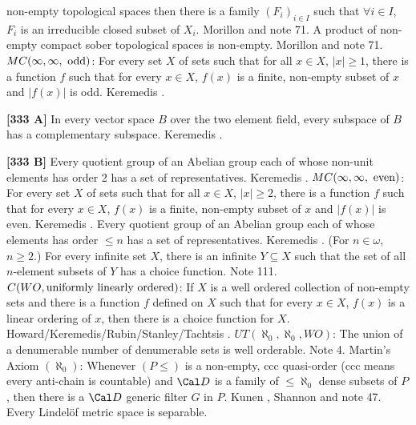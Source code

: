 non-empty topological spaces then there is a family $(F_i)_{i\in I}$
such that $\forall i\in I$, $F_i$ is an irreducible closed subset of
$X_i$.  \ac{Morillon} \cite{1988} and note 71.
\medskip
{}  A product of non-empty compact sober
topological spaces is non-empty.  \ac{Morillon} \cite{1988} and note 71.
\medskip
{} $MC(\infty,\infty,\hbox{ odd})$: For every
set $X$ of  sets such that for all $x\in X$, $|x|\ge 1$, there is a
function $f$ such that  for every $x\in X$, $f(x)$ is a finite, non-empty
subset of $x$ and $|f(x)|$ is odd. \ac{Keremedis} \cite{1996a}.
\smallskip
\item{}{\bf [333 A]} In every vector space $B$ over the two element field,
every subspace of $B$ has a complementary subspace. \ac{Keremedis}
\cite{1996a}.
\smallskip
\item{}{\bf [333 B]} Every quotient group of an Abelian group each of whose
non-unit elements has order 2 has a set of representatives. \ac{Keremedis}
\cite{1996b}.
\medskip
{} $MC(\infty,\infty,\hbox{ even})$: For every
set $X$ of  sets such that for all $x\in X$, $|x|\ge 2$, there is a
function $f$ such that  for every $x\in X$, $f(x)$ is a finite,
non-empty subset of $x$ and $|f(x)|$ is even. \ac{Keremedis}
\cite{1996a}.
\medskip
{} Every quotient group of an Abelian group
each of whose elements has order  $\le n$ has a set of representatives.
\ac{Keremedis} \cite{1996b}.
\medskip
{} (For $n\in\omega$, $n\ge 2$.)  For every
infinite set $X$, there is an infinite $Y \subseteq X$ such that the
set of all $n$-element subsets of $Y$ has a choice function.  Note 111.
\medskip
{} $C(WO,\hbox{uniformly linearly ordered})$:  If
$X$ is a well ordered collection of non-empty sets and there is a function
$f$ defined on $X$ such that for every $x\in X$, $f(x)$ is a linear
ordering of $x$, then there is a choice function for $X$.
\ac{Howard/Keremedis/Rubin/Stanley/Tachtsis} \cite{1999}.
\medskip
{}  $UT(\aleph_0,\aleph_0,WO)$: The union
of a denumerable number of denumerable sets is well orderable.
Note 4.
\medskip
{}  Martin's Axiom $(\aleph_{0})$: Whenever
$(P\le)$ is a non-empty, ccc  quasi-order (ccc means every anti-chain
is countable) and ${\Cal D}$ is a family of $\le\aleph_0$ dense
subsets of $P$, then there is a ${\Cal D}$ generic filter $G$ in $P$.
\ac{Kunen} \cite{1980}, \ac{Shannon} \cite{1990} and note 47.
\medskip
{} Every Lindel\"of metric space is separable.
